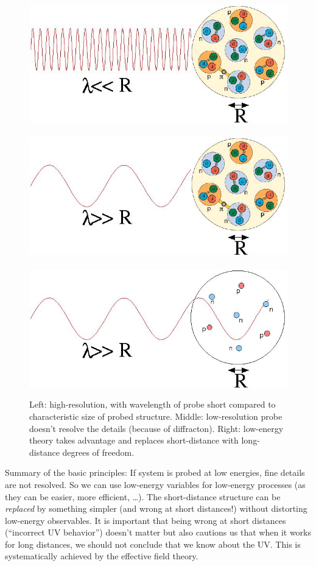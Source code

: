   \begin{figure}[tbh]
  \begin{center}
    \includegraphics[width=2.in]{figures/resol3}~~~%
    \includegraphics[width=2.in]{figures/resol3a}~~~%
    \includegraphics[width=2.in]{figures/resol3b}
    \caption{Left: high-resolution, with wavelength of probe short compared
    to characteristic size of probed structure.  Middle: low-resolution probe
    doesn't resolve the details (because of diffracton).  Right: low-energy
    theory takes advantage and replaces short-distance with long-distance
    degrees of freedom.}
    \label{fig:resolving}
  \end{center}
  \end{figure}

Summary of the basic principles:
\bi
 \I
 If system is probed at low energies,
     fine details are not resolved.
 \I So we can use low-energy variables for low-energy processes
        (as they can be easier, more efficient, \ldots).
 \I The short-distance structure can be 
        \emph{replaced} by something simpler  
         (and wrong at short distances!) 
        without distorting low-energy  observables.  It is important that being
        wrong at short distances (``incorrect UV behavior'') doesn't matter but also
        cautions us that when it works for long distances, we should not conclude
        that we know about the UV.
  \I This is systematically achieved by the
         effective field theory.
\ei

